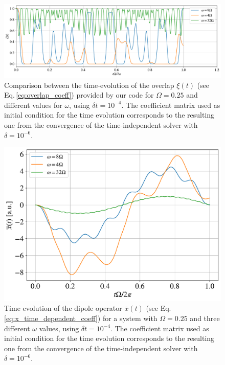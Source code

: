 \begin{figure}[h!]
    \centering
    \includegraphics[scale=0.5]{images/overlaps_different_omega.pdf}
    \caption{Comparison between the time-evolution of the overlap $\xi(t)$ (see Eq.\,\ref{eq:overlap_coeff}) provided by our code for $\Omega=0.25$ and different values for $\omega$, using $\delta t = 10^{-4}$. The coefficient matrix used as initial condition for the time evolution corresponds to the resulting one from the convergence of the time-independent solver with $\delta=10^{-6}$.}
    \label{fig:overlap_comp_omega}
\end{figure}

\begin{figure}[t!]
    \centering
    \includegraphics[scale=0.38]{images/dipoles_different_omega.pdf}
    \caption{Time evolution of the dipole operator $\overline{x}(t)$ (see Eq.\,\ref{eq:x_time_dependent_coeff}) for a system with $\Omega=0.25$ and three different $\omega$ values, using $\delta t = 10^{-4}$. The coefficient matrix used as initial condition for the time evolution corresponds to the resulting one from the convergence of the time-independent solver with $\delta=10^{-6}$.}
    \label{fig:dipole_comp}
\end{figure}


